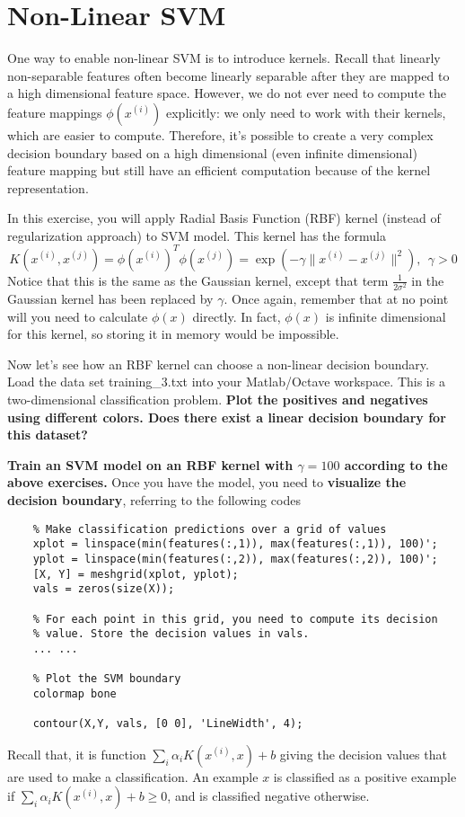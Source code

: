 \documentclass[10pt,a4paper]{article}
\begin{document}
\section{Non-Linear SVM}
%
  One way to enable non-linear SVM is to introduce kernels. Recall that linearly non-separable features often become linearly separable after they are mapped to a high dimensional feature space. However, we do not ever need to compute the feature mappings $\phi(x^{(i)})$ explicitly: we only need to work with their kernels, which are easier to compute. Therefore, it's possible to create a very complex decision boundary based on a high dimensional (even infinite dimensional) feature mapping but still have an efficient computation because of the kernel representation.

  In this exercise, you will apply Radial Basis Function (RBF) kernel (instead of regularization approach) to SVM model. This kernel has the formula
  \begin{equation*}
    K(x^{(i)}, x^{(j)}) = \phi(x^{(i)})^T \phi(x^{(j)}) = \exp\left(-\gamma \|x^{(i)} - x^{(j)}\|^2\right), ~~\gamma>0
  \end{equation*}
  Notice that this is the same as the Gaussian kernel, except that term $\frac{1}{2\sigma^2}$ in the Gaussian kernel has been replaced by $\gamma$. Once again, remember that at no point will you need to calculate $\phi(x)$ directly. In fact, $\phi(x)$ is infinite dimensional for this kernel, so storing it in memory would be impossible.


  Now let's see how an RBF kernel can choose a non-linear decision boundary. Load the data set \textsf{training\_3.txt} into your Matlab/Octave workspace. This is a two-dimensional classification problem. \textbf{Plot the positives and negatives using different colors. Does there exist a linear decision boundary for this dataset?}


  \textbf{Train an SVM model on an RBF kernel with $\gamma = 100$ according to the above exercises.} Once you have the model, you need to \textbf{visualize the decision boundary}, referring to the following codes
  \begin{lstlisting}
    % Make classification predictions over a grid of values
    xplot = linspace(min(features(:,1)), max(features(:,1)), 100)';
    yplot = linspace(min(features(:,2)), max(features(:,2)), 100)';
    [X, Y] = meshgrid(xplot, yplot);
    vals = zeros(size(X));

    % For each point in this grid, you need to compute its decision 
    % value. Store the decision values in vals.
    ... ...

    % Plot the SVM boundary
    colormap bone

    contour(X,Y, vals, [0 0], 'LineWidth', 4);
  \end{lstlisting}
  Recall that, it is function $\sum_i \alpha_i K(x^{(i)}, x) + b$ giving the decision values that are used to make a classification. An example  $x$ is classified as a positive example if  $\sum_i \alpha_i K(x^{(i)}, x) + b \geq 0$, and is classified negative otherwise.
\end{document}
